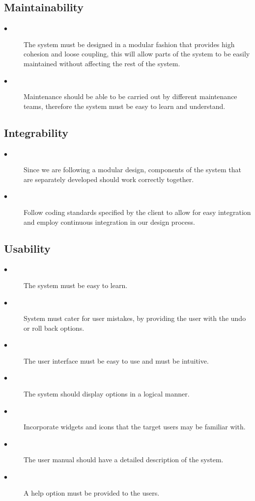 \documentclass{article}
\begin{document}
    \subsection{Maintainability}

        \begin{description}

        \item[$\bullet$] The system must be designed in a modular fashion that provides high cohesion and loose coupling, this will allow parts of the system to be easily maintained without affecting the rest of the system.
        \item[$\bullet$]Maintenance should be able to be carried out by different maintenance teams, therefore the system must be easy to learn and understand.

        \end{description}

    \subsection{Integrability}

        \begin{description}

        \item[$\bullet$] Since we are following a modular design, components of the system that are separately developed should work correctly together.
        \item[$\bullet$] Follow coding standards specified by the client to allow for easy integration and employ continuous integration in our design process.

        \end{description}

    \subsection{Usability}

        \begin{description}

        \item[$\bullet$] The system must be easy to learn.
        \item[$\bullet$]System must cater for user mistakes, by providing the user with the undo or roll back options.
        \item[$\bullet$]The user interface must be easy to use and must be intuitive.
        \item[$\bullet$]The system should display options in a logical manner.
        \item[$\bullet$]Incorporate widgets and icons that the target users may be familiar with.
        \item[$\bullet$]The user manual should have a detailed description of the system.
        \item[$\bullet$]A help option must be provided to the users.

        \end{description}
\end{document}

